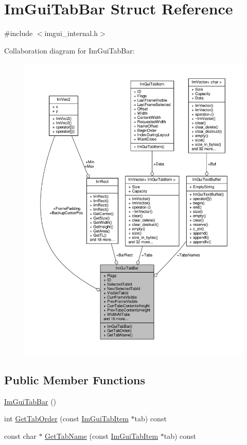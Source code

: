 \hypertarget{structImGuiTabBar}{}\section{Im\+Gui\+Tab\+Bar Struct Reference}
\label{structImGuiTabBar}


{\ttfamily \#include $<$imgui\+\_\+internal.\+h$>$}



Collaboration diagram for Im\+Gui\+Tab\+Bar\+:
\nopagebreak
\begin{figure}[H]
\begin{center}
\leavevmode
\includegraphics[width=350pt]{structImGuiTabBar__coll__graph}
\end{center}
\end{figure}
\subsection*{Public Member Functions}
\begin{DoxyCompactItemize}
\item 
\hyperlink{structImGuiTabBar_a7d04467b887730a184365fdb3cb5bb17}{Im\+Gui\+Tab\+Bar} ()
\item 
int \hyperlink{structImGuiTabBar_aced33dc6164509331b3430239bd7dcbd}{Get\+Tab\+Order} (const \hyperlink{structImGuiTabItem}{Im\+Gui\+Tab\+Item} $\ast$tab) const
\item 
const char $\ast$ \hyperlink{structImGuiTabBar_a9296111fbd2316f354ca4bf952a09b93}{Get\+Tab\+Name} (const \hyperlink{structImGuiTabItem}{Im\+Gui\+Tab\+Item} $\ast$tab) const
\end{DoxyCompactItemize}

